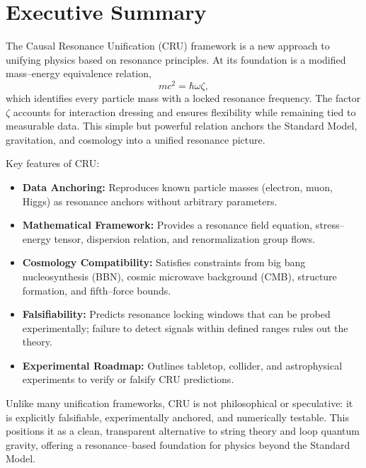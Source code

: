 \section*{Executive Summary}

The Causal Resonance Unification (CRU) framework is a new approach to unifying physics based on resonance principles. At its foundation is a modified mass–energy equivalence relation,
\[
m c^2 = \hbar \omega \zeta ,
\]
which identifies every particle mass with a locked resonance frequency. The factor $\zeta$ accounts for interaction dressing and ensures flexibility while remaining tied to measurable data. This simple but powerful relation anchors the Standard Model, gravitation, and cosmology into a unified resonance picture.

Key features of CRU:
\begin{itemize}
  \item \textbf{Data Anchoring:} Reproduces known particle masses (electron, muon, Higgs) as resonance anchors without arbitrary parameters.
  \item \textbf{Mathematical Framework:} Provides a resonance field equation, stress--energy tensor, dispersion relation, and renormalization group flows.
  \item \textbf{Cosmology Compatibility:} Satisfies constraints from big bang nucleosynthesis (BBN), cosmic microwave background (CMB), structure formation, and fifth--force bounds.
  \item \textbf{Falsifiability:} Predicts resonance locking windows that can be probed experimentally; failure to detect signals within defined ranges rules out the theory.
  \item \textbf{Experimental Roadmap:} Outlines tabletop, collider, and astrophysical experiments to verify or falsify CRU predictions.
\end{itemize}

Unlike many unification frameworks, CRU is not philosophical or speculative: it is explicitly falsifiable, experimentally anchored, and numerically testable. This positions it as a clean, transparent alternative to string theory and loop quantum gravity, offering a resonance--based foundation for physics beyond the Standard Model.
